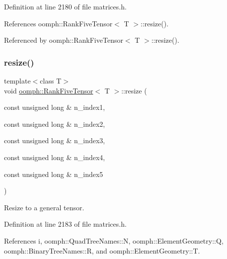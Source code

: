 Definition at line 2180 of file matrices.\+h.



References oomph\+::\+Rank\+Five\+Tensor$<$ T $>$\+::resize().



Referenced by oomph\+::\+Rank\+Five\+Tensor$<$ T $>$\+::resize().

\mbox{\label{classoomph_1_1RankFiveTensor_afdd04cd2a29fb7b8c41f5300200813e1}} 
\subsubsection{\texorpdfstring{resize()}{resize()}\hspace{0.1cm}{\footnotesize\ttfamily [2/3]}}
{\footnotesize\ttfamily template$<$class T$>$ \\
void \hyperlink{classoomph_1_1RankFiveTensor}{oomph\+::\+Rank\+Five\+Tensor}$<$ T $>$\+::resize (\begin{DoxyParamCaption}\item[{const unsigned long \&}]{n\+\_\+index1,  }\item[{const unsigned long \&}]{n\+\_\+index2,  }\item[{const unsigned long \&}]{n\+\_\+index3,  }\item[{const unsigned long \&}]{n\+\_\+index4,  }\item[{const unsigned long \&}]{n\+\_\+index5 }\end{DoxyParamCaption})\hspace{0.3cm}{\ttfamily [inline]}}



Resize to a general tensor. 



Definition at line 2183 of file matrices.\+h.



References i, oomph\+::\+Quad\+Tree\+Names\+::N, oomph\+::\+Element\+Geometry\+::Q, oomph\+::\+Binary\+Tree\+Names\+::R, and oomph\+::\+Element\+Geometry\+::T.

\mbox{\label{classoomph_1_1RankFiveTensor_a80eeaef66e9252fa5d1d7031e4ec402c}} 

